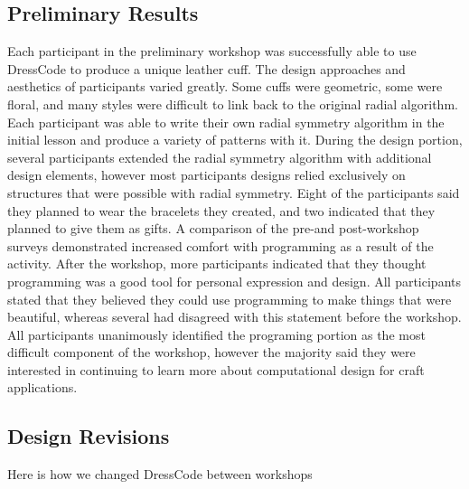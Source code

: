 \documentclass{sigchi}
\begin{document}
\subsection{Preliminary Results}
Each participant in the preliminary workshop was successfully able to use DressCode to produce a unique leather cuff. The design approaches and aesthetics of participants varied greatly. Some cuffs were geometric, some were floral, and many styles were difficult to link back to the original radial algorithm. Each participant was able to write their own radial symmetry algorithm in the initial lesson and produce a variety of patterns with it. During the design portion, several participants extended the radial symmetry algorithm with additional design elements, however most participants designs relied exclusively on structures that were possible with radial symmetry. Eight of the participants said they planned to wear the bracelets they created, and two indicated that they planned to give them as gifts. A comparison of the
pre-and post-workshop surveys demonstrated increased comfort with programming as a result of the activity. After the workshop, more participants indicated that they thought programming was a good tool for personal expression and design. All participants stated that they believed they could use programming to make things that were beautiful, whereas several had disagreed with this statement before the workshop. All participants unanimously identified the programing portion as the most difficult component of the workshop, however the majority said they were interested in continuing to learn more about computational design for craft applications. 

\subsection{Design Revisions} Here is how we changed DressCode between workshops
\end{document}
